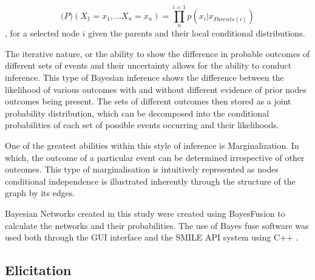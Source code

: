 \begin{equation}
        \mathbb(P) (X_{1}=x_{1},...X_{n}=x_{n})=\prod_{n}^{i=1}p(x_{i}|x_{Parents(i)})
\end{equation},
for a selected node $i$ given the parents and their local conditional distributions.

The iterative nature, or the ability to show the difference in probable outcomes of different sets of events and their uncertainty allows for the ability to conduct inference. This type of Bayesian inference shows the difference between the likelihood of various outcomes with and without different evidence of prior nodes outcomes being present. The sets of different outcomes then stored as a joint probability distribution, which can be decomposed into the conditional probabilities of each set of possible events occurring and their likelihoods.

One of the greatest abilities within this style of inference is Marginalization. In which, the outcome of a particular event can be determined irrespective of other outcomes. This type of marginalisation is intuitively represented as nodes conditional independence is illustrated inherently through the structure of the graph by its edges.

Bayesian Networks created in this study were created using BayesFusion \citep{bayesfusionGeNIeModelerUSER2022} to calculate the networks and their probabilities. The use of Bayes fuse software was used both through the GUI interface and the SMILE API \citep{bayesfusionGeNIeModelerUSER2022} system using C++ \citep{ISO:2012:III}.

\subsection{Elicitation}

